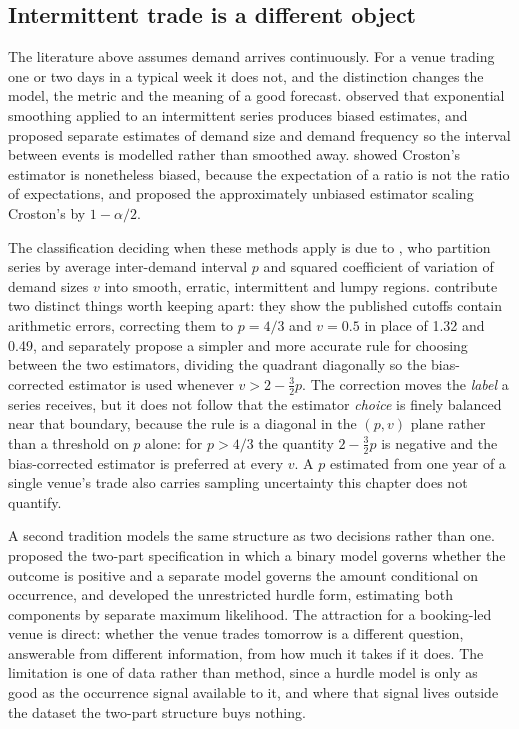 \subsection{Intermittent trade is a different object}

The literature above assumes demand arrives continuously. For a venue trading one
or two days in a typical week it does not, and the distinction changes the model,
the metric and the meaning of a good forecast.
\citet{croston_forecasting_1972} observed that exponential smoothing applied to
an intermittent series produces biased estimates, and proposed separate estimates
of demand size and demand frequency so the interval between events is modelled
rather than smoothed away. \citet{syntetos_accuracy_2005} showed Croston's
estimator is nonetheless biased, because the expectation of a ratio is not the
ratio of expectations, and proposed the approximately unbiased estimator scaling
Croston's by $1 - \alpha/2$.

The classification deciding when these methods apply is due to
\citet{syntetos_categorization_2005}, who partition series by average
inter-demand interval $p$ and squared coefficient of variation of demand sizes
$v$ into smooth, erratic, intermittent and lumpy regions.
\citet{kostenko_note_2006} contribute two distinct things worth keeping apart:
they show the published cutoffs contain arithmetic errors, correcting them to
$p = 4/3$ and $v = 0.5$ in place of 1.32 and 0.49, and separately propose a
simpler and more accurate rule for choosing between the two estimators, dividing
the quadrant diagonally so the bias-corrected estimator is used whenever
$v > 2 - \tfrac{3}{2}p$. The correction moves the \emph{label} a series receives,
but it does not follow that the estimator \emph{choice} is finely balanced near
that boundary, because the rule is a diagonal in the $(p, v)$ plane rather than a
threshold on $p$ alone: for $p > 4/3$ the quantity $2 - \tfrac{3}{2}p$ is
negative and the bias-corrected estimator is preferred at every $v$. A $p$
estimated from one year of a single venue's trade also carries sampling
uncertainty this chapter does not quantify.

A second tradition models the same structure as two decisions rather than one.
\citet{cragg_statistical_1971} proposed the two-part specification in which a
binary model governs whether the outcome is positive and a separate model governs
the amount conditional on occurrence, and \citet{mullahy_specification_1986}
developed the unrestricted hurdle form, estimating both components by separate
maximum likelihood. The attraction for a booking-led venue is direct: whether the
venue trades tomorrow is a different question, answerable from different
information, from how much it takes if it does. The limitation is one of data
rather than method, since a hurdle model is only as good as the occurrence signal
available to it, and where that signal lives outside the dataset the two-part
structure buys nothing.

